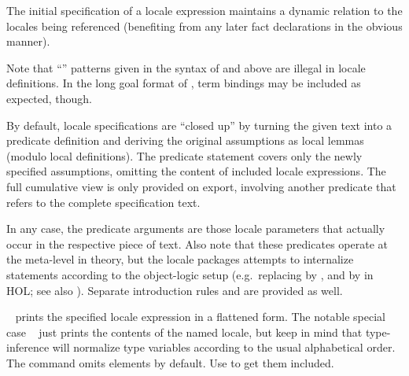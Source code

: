 \begin{isabellebody}
\begin{isamarkuptext}
\begin{description}
\begin{description}
  The initial  specification of a locale expression
  maintains a dynamic relation to the locales being referenced
  (benefiting from any later fact declarations in the obvious manner).

  \end{description}
  
  Note that ``'' patterns given
  in the syntax of \hyperlink{element.assumes}{\mbox{}} and \hyperlink{element.defines}{\mbox{}} above
  are illegal in locale definitions.  In the long goal format of
  , term bindings may be included as expected,
  though.
  
  \medskip By default, locale specifications are ``closed up'' by
  turning the given text into a predicate definition  and deriving the original assumptions as local lemmas
  (modulo local definitions).  The predicate statement covers only the
  newly specified assumptions, omitting the content of included locale
  expressions.  The full cumulative view is only provided on export,
  involving another predicate  that refers to the complete
  specification text.
  
  In any case, the predicate arguments are those locale parameters
  that actually occur in the respective piece of text.  Also note that
  these predicates operate at the meta-level in theory, but the locale
  packages attempts to internalize statements according to the
  object-logic setup (e.g.\ replacing \isa{{\isasymAnd}} by \isa{{\isasymforall}}, and
  \isa{{\isachardoublequote}{\isasymLongrightarrow}{\isachardoublequote}} by \isa{{\isachardoublequote}{\isasymlongrightarrow}{\isachardoublequote}} in HOL; see also
  ).  Separate introduction rules  and  are provided as well.
  
  \item \hyperlink{command.print-locale}{\mbox{}}~ prints the
  specified locale expression in a flattened form.  The notable
  special case \hyperlink{command.print-locale}{\mbox{}}~ just prints the
  contents of the named locale, but keep in mind that type-inference
  will normalize type variables according to the usual alphabetical
  order.  The command omits \hyperlink{element.notes}{\mbox{}} elements by default.
  Use \hyperlink{command.print-locale}{\mbox{}}\isa{{\isachardoublequote}{\isacharbang}{\isachardoublequote}} to get them included.


\end{description}
\end{isamarkuptext}
\end{isabellebody}
